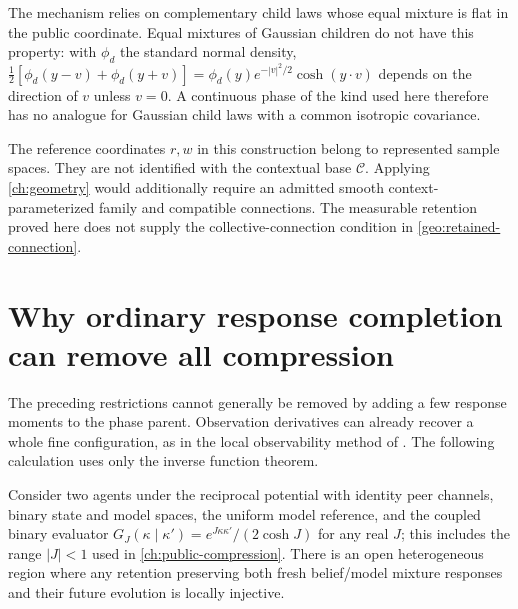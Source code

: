 The mechanism relies on complementary child laws whose equal mixture is flat in the public coordinate. Equal mixtures of Gaussian children do not have this property: with $\phi_d$ the standard normal density, $\frac12[\phi_d(y-v)+\phi_d(y+v)]=\phi_d(y)e^{-|v|^2/2}\cosh(y\cdot v)$ depends on the direction of $v$ unless $v=0$. A continuous phase of the kind used here therefore has no analogue for Gaussian child laws with a common isotropic covariance.

The reference coordinates $r,w$ in this construction belong to represented sample spaces. They are not identified with the contextual base $\mathcal C$. Applying \cref{ch:geometry} would additionally require an admitted smooth context-parameterized family and compatible connections. The measurable retention proved here does not supply the collective-connection condition in \cref{geo:retained-connection}.

\section{Why ordinary response completion can remove all compression}
\label{sec:boundary-observability}

The preceding restrictions cannot generally be removed by adding a few response moments to the phase parent. Observation derivatives can already recover a whole fine configuration, as in the local observability method of \citet{HermannKrener1977}. The following calculation uses only the inverse function theorem.

Consider two agents under the reciprocal potential with identity peer channels, binary state and model spaces, the uniform model reference, and the coupled binary evaluator $G_J(\kappa\mid\kappa')=e^{J\kappa\kappa'}/(2\cosh J)$ for any real $J$; this includes the range $|J|<1$ used in \cref{ch:public-compression}. There is an open heterogeneous region where any retention preserving both fresh belief/model mixture responses and their future evolution is locally injective.

